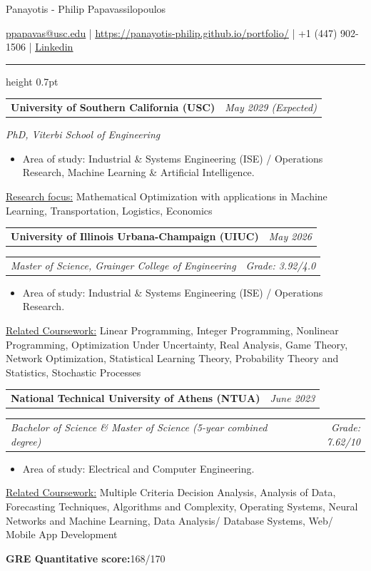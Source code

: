 \documentclass[11pt,a4paper]{article}
\makeatletter
\newcommand{\cvsection}[1]{\par\vspace{13pt}{\bfseries #1}\par\nobreak\hrule height 0.7pt\relax\vspace{2pt}}
\newcommand{\cvrow}[2]{\noindent\begin{tabularx}{\linewidth}{@{}Xr@{}}#1 & #2\end{tabularx}\par}
\newcommand{\entrygap}{\par\vspace{3pt}}
\makeatother
\begin{document}
\fontsize{11}{12}\selectfont
\begin{center}
{\fontsize{14}{17}\selectfont Panayotis - Philip Papavassilopoulos}\par
\vspace{6pt}
\href{mailto:ppapavas@usc.edu}{\underline{ppapavas@usc.edu}} | \href{https://panayotis-philip.github.io/portfolio/}{\underline{https://panayotis-philip.github.io/portfolio/}} | +1 (447) 902-1506 | \href{https://www.linkedin.com/in/panayotis-philip-papavassilopoulos/}{\underline{Linkedin}}
\end{center}
\vspace{-14pt}
\cvsection{EDUCATION}
\cvrow{\textbf{University of Southern California (USC)}}{\textit{May 2029 (Expected)}}
\textit{PhD, Viterbi School of Engineering}\par
\begin{itemize}
\item Area of study: Industrial \& Systems Engineering (ISE) / Operations Research, Machine Learning \& Artificial Intelligence.
\end{itemize}
\underline{Research focus:} Mathematical Optimization with applications in Machine Learning, Transportation, Logistics, Economics
\entrygap
\cvrow{\textbf{University of Illinois Urbana-Champaign (UIUC)}}{\textit{May 2026}}
\cvrow{\textit{Master of Science, Grainger College of Engineering}}{\textit{Grade: 3.92/4.0}}
\begin{itemize}
\item Area of study: Industrial \& Systems Engineering (ISE) / Operations Research.
\end{itemize}
\underline{Related Coursework:} Linear Programming, Integer Programming, Nonlinear Programming, Optimization Under Uncertainty, Real Analysis, Game Theory, Network Optimization, Statistical Learning Theory, Probability Theory and Statistics, Stochastic Processes
\entrygap
\cvrow{\textbf{National Technical University of Athens (NTUA)}}{\textit{June 2023}}
\cvrow{\textit{Bachelor of Science \& Master of Science (5-year combined degree)}}{\textit{Grade: 7.62/10}}
\begin{itemize}
\item Area of study: Electrical and Computer Engineering.
\end{itemize}
\underline{Related Coursework:} Multiple Criteria Decision Analysis, Analysis of Data, Forecasting Techniques, Algorithms and Complexity, Operating Systems, Neural Networks and Machine Learning, Data Analysis/ Database Systems, Web/ Mobile App Development
\par\vspace{8pt}
\textbf{GRE Quantitative score:}168/170
\end{document}
